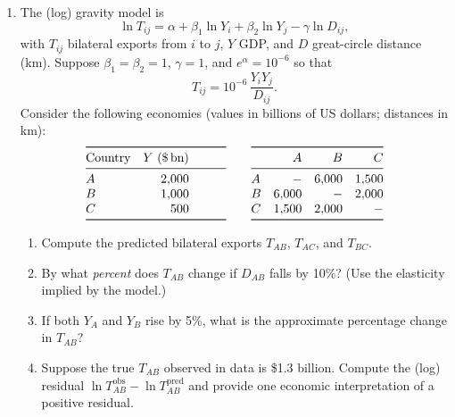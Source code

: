 \documentclass[11pt]{article}
\begin{document}
\begin{enumerate}[leftmargin=*, resume]
\item
The (log) gravity model is
\[
\ln T_{ij}=\alpha + \beta_1 \ln Y_i + \beta_2 \ln Y_j - \gamma \ln D_{ij},
\]
with $T_{ij}$ bilateral exports from $i$ to $j$, $Y$ GDP, and $D$ great-circle distance (km). Suppose $\beta_1=\beta_2=1$, $\gamma=1$, and $e^\alpha=10^{-6}$ so that
\[
T_{ij}=10^{-6}\,\frac{Y_i Y_j}{D_{ij}}.
\]
Consider the following economies (values in billions of US dollars; distances in km):
\[
\begin{array}{@{}lrrrr@{}}
\toprule
\text{Country} & Y \ (\$\,\text{bn}) & & & \\
\midrule
A & 2{,}000 &&&\\
B & 1{,}000 &&&\\
C & \phantom{0}500 &&&\\
\bottomrule
\end{array}
\qquad
\begin{array}{@{}lrrr@{}}
\toprule
 & A & B & C\\
\midrule
A & - & 6{,}000 & 1{,}500\\
B & 6{,}000 & - & 2{,}000\\
C & 1{,}500 & 2{,}000 & - \\
\bottomrule
\end{array}
\]
\begin{enumerate}
\item Compute the predicted bilateral exports $T_{AB}$, $T_{AC}$, and $T_{BC}$.
\item By what \emph{percent} does $T_{AB}$ change if $D_{AB}$ falls by 10\%? (Use the elasticity implied by the model.)
\item If both $Y_A$ and $Y_B$ rise by 5\%, what is the approximate percentage change in $T_{AB}$?
\item Suppose the true $T_{AB}$ observed in data is \$\num{1.3} billion. Compute the (log) residual $\ln T^{\text{obs}}_{AB}-\ln T^{\text{pred}}_{AB}$ and provide one economic interpretation of a positive residual.
\end{enumerate}

\end{enumerate}





\newpage
\end{document}

